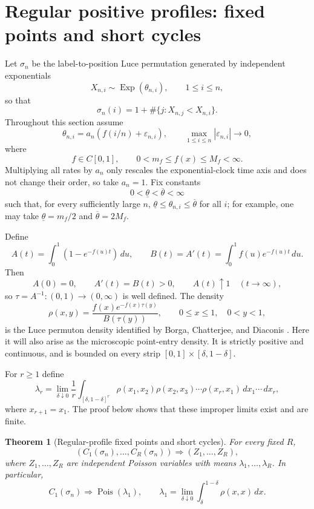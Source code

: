 \documentclass[11pt]{article}
\newtheorem{theorem}{Theorem}[section]
\theoremstyle{remark}
\newcommand{\Pois}{\operatorname{Pois}}
\newcommand{\Exp}{\operatorname{Exp}}
\newcommand{\dd}{\,d}
\newcommand{\eps}{\varepsilon}
\begin{document}

\section{Regular positive profiles: fixed points and short cycles}\label{sec:regular}

Let \(\sigma_n\) be the label-to-position Luce permutation generated by independent exponentials
\[
        X_{n,i}\sim \Exp(\theta_{n,i}),\qquad 1\le i\le n,
\]
so that
\[
        \sigma_n(i)=1+\#\{j:X_{n,j}<X_{n,i}\}.
\]
Throughout this section assume
\[
        \theta_{n,i}=a_n(f(i/n)+\eps_{n,i}),
        \qquad \max_{1\le i\le n}|\eps_{n,i}|\to0,
\]
where
\[
        f\in C[0,1],\qquad 0<m_f\le f(x)\le M_f<\infty.
\]
Multiplying all rates by \(a_n\) only rescales the exponential-clock time axis
and does not change their order, so take \(a_n=1\).  Fix constants
\[
        0<\underline\theta<\overline\theta<\infty
\]
such that, for every sufficiently large $n$,
$\underline\theta\le\theta_{n,i}\le\overline\theta$ for all $i$; for
example, one may take $\underline\theta=m_f/2$ and
$\overline\theta=2M_f$.

Define
\[
        A(t)=\int_0^1(1-e^{-f(u)t})\dd u,
        \qquad
        B(t)=A'(t)=\int_0^1 f(u)e^{-f(u)t}\dd u.
\]
Then
\[
        A(0)=0,\qquad A'(t)=B(t)>0,\qquad A(t)\uparrow1
        \quad(t\to\infty),
\]
so $\tau=A^{-1}:(0,1)\to(0,\infty)$ is well defined.  The density
\[
        \rho(x,y)=\frac{f(x)e^{-f(x)\tau(y)}}{B(\tau(y))},
        \qquad 0\le x\le1,\quad 0<y<1,
\]
is the Luce permuton density identified by Borga, Chatterjee, and Diaconis
\cite[Proposition~2.2]{BCD2025}.  Here it will also arise as the microscopic
point-entry density.  It is strictly positive and continuous, and is bounded
on every strip $[0,1]\times[\delta,1-\delta]$.

For \(r\ge1\) define
\[
        \lambda_r
        =\lim_{\delta\downarrow0}\frac1r
        \int_{[\delta,1-\delta]^r}
        \rho(x_1,x_2)\rho(x_2,x_3)\cdots\rho(x_r,x_1)
        \dd x_1\cdots\dd x_r,
\]
where \(x_{r+1}=x_1\).  The proof below shows that these improper limits exist and are finite.

\begin{theorem}[Regular-profile fixed points and short cycles]\label{thm:regular-cycles}
For every fixed \(R\),
\[
        (C_1(\sigma_n),\ldots,C_R(\sigma_n))
        \Rightarrow (Z_1,\ldots,Z_R),
\]
where \(Z_1,\ldots,Z_R\) are independent Poisson variables with means
\(\lambda_1,\ldots,\lambda_R\).  In particular,
\[
        C_1(\sigma_n)\Rightarrow\Pois(\lambda_1),
        \qquad
        \lambda_1=\lim_{\delta\downarrow0}\int_\delta^{1-\delta}\rho(x,x)\dd x .
\]
\end{theorem}
\end{document}
